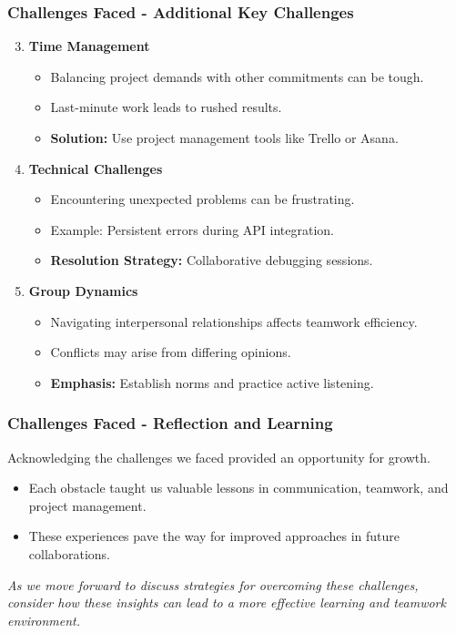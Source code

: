 \documentclass[aspectratio=169]{beamer}
\begin{document}
\begin{frame}[fragile]
    \frametitle{Challenges Faced - Additional Key Challenges}
    \begin{enumerate}
        \setcounter{enumi}{2} %
        \item \textbf{Time Management}
            \begin{itemize}
                \item Balancing project demands with other commitments can be tough.
                \item Last-minute work leads to rushed results.
                \item \textbf{Solution:} Use project management tools like Trello or Asana.
            \end{itemize}

        \item \textbf{Technical Challenges}
            \begin{itemize}
                \item Encountering unexpected problems can be frustrating.
                \item Example: Persistent errors during API integration.
                \item \textbf{Resolution Strategy:} Collaborative debugging sessions.
            \end{itemize}

        \item \textbf{Group Dynamics}
            \begin{itemize}
                \item Navigating interpersonal relationships affects teamwork efficiency.
                \item Conflicts may arise from differing opinions.
                \item \textbf{Emphasis:} Establish norms and practice active listening.
            \end{itemize}
    \end{enumerate}
\end{frame}

\begin{frame}[fragile]
    \frametitle{Challenges Faced - Reflection and Learning}
    Acknowledging the challenges we faced provided an opportunity for growth. 
    \begin{itemize}
        \item Each obstacle taught us valuable lessons in communication, teamwork, and project management.
        \item These experiences pave the way for improved approaches in future collaborations.
    \end{itemize}
    \textit{As we move forward to discuss strategies for overcoming these challenges, consider how these insights can lead to a more effective learning and teamwork environment.}
\end{frame}
\end{document}
